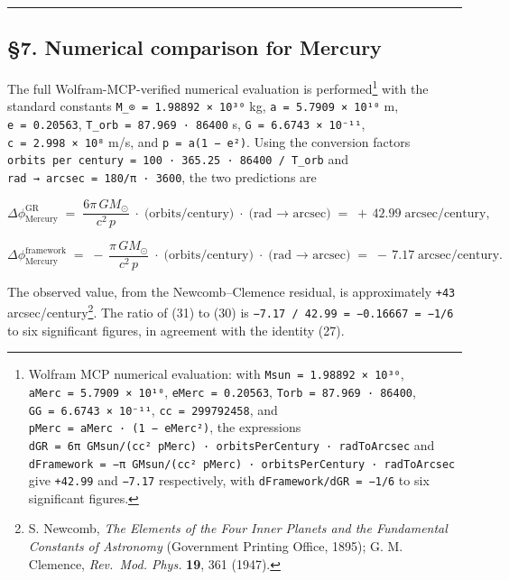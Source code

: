 \documentclass[
  11pt,
]{article}
\begin{document}
\begin{center}\rule{0.5\linewidth}{0.5pt}\end{center}

\hypertarget{numerical-comparison-for-mercury}{%
\subsection{§7. Numerical comparison for
Mercury}\label{numerical-comparison-for-mercury}}

The full Wolfram-MCP-verified numerical evaluation is
performed\footnote{Wolfram MCP numerical evaluation: with
  \texttt{Msun\ =\ 1.98892\ ×\ 10³⁰},
  \texttt{aMerc\ =\ 5.7909\ ×\ 10¹⁰}, \texttt{eMerc\ =\ 0.20563},
  \texttt{Torb\ =\ 87.969\ ·\ 86400}, \texttt{GG\ =\ 6.6743\ ×\ 10⁻¹¹},
  \texttt{cc\ =\ 299792458}, and
  \texttt{pMerc\ =\ aMerc\ ·\ (1\ −\ eMerc²)}, the expressions
  \texttt{dGR\ =\ 6π\ GMsun/(cc²\ pMerc)\ ·\ orbitsPerCentury\ ·\ radToArcsec}
  and
  \texttt{dFramework\ =\ −π\ GMsun/(cc²\ pMerc)\ ·\ orbitsPerCentury\ ·\ radToArcsec}
  give \texttt{+42.99} and \texttt{−7.17} respectively, with
  \texttt{dFramework/dGR\ =\ −1/6} to six significant figures.} with the
standard constants \texttt{M\_⊙\ =\ 1.98892\ ×\ 10³⁰} kg,
\texttt{a\ =\ 5.7909\ ×\ 10¹⁰} m, \texttt{e\ =\ 0.20563},
\texttt{T\_orb\ =\ 87.969\ ·\ 86400} s, \texttt{G\ =\ 6.6743\ ×\ 10⁻¹¹},
\texttt{c\ =\ 2.998\ ×\ 10⁸} m/s, and \texttt{p\ =\ a(1\ −\ e²)}. Using
the conversion factors
\texttt{orbits\ per\ century\ =\ 100\ ·\ 365.25\ ·\ 86400\ /\ T\_orb}
and \texttt{rad\ →\ arcsec\ =\ 180/π\ ·\ 3600}, the two predictions are

\[
\Delta\phi^{\text{GR}}_{\text{Mercury}}
\;=\; \frac{6\pi\,GM_{\odot}}{c^{2}\,p}\;\cdot\;\text{(orbits/century)}\;\cdot\;\text{(rad → arcsec)}
\;=\; +\,42.99\;\text{arcsec/century}, \tag{30}
\]

\[
\Delta\phi^{\text{framework}}_{\text{Mercury}}
\;=\; -\,\frac{\pi\,GM_{\odot}}{c^{2}\,p}\;\cdot\;\text{(orbits/century)}\;\cdot\;\text{(rad → arcsec)}
\;=\; -\,7.17\;\text{arcsec/century}. \tag{31}
\]

The observed value, from the Newcomb--Clemence residual, is
approximately \texttt{+43} arcsec/century\footnote{S. Newcomb, \emph{The
  Elements of the Four Inner Planets and the Fundamental Constants of
  Astronomy} (Government Printing Office, 1895); G. M. Clemence,
  \emph{Rev.~Mod. Phys.} \textbf{19}, 361 (1947).}. The ratio of (31) to
(30) is \texttt{−7.17\ /\ 42.99\ =\ −0.16667\ =\ −1/6} to six
significant figures, in agreement with the identity (27).
\end{document}
